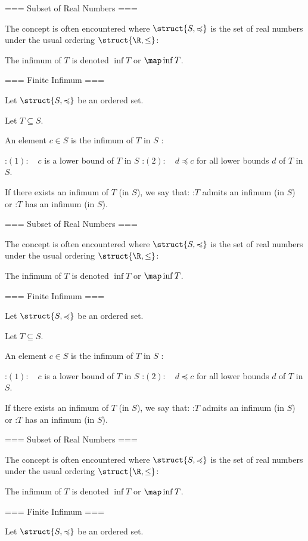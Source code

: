 === Subset of Real Numbers ===

The concept is often encountered where $\struct {S, \preccurlyeq}$ is the set of real numbers under the usual ordering $\struct {\R, \le}$:



The infimum of $T$ is denoted $\inf T$ or $\map \inf T$.


=== Finite Infimum ===

Let $\struct {S, \preccurlyeq}$ be an ordered set.

Let $T \subseteq S$.


An element $c \in S$ is the infimum of $T$ in $S$ :

:$(1): \quad c$ is a lower bound of $T$ in $S$
:$(2): \quad d \preccurlyeq c$ for all lower bounds $d$ of $T$ in $S$.


If there exists an infimum of $T$ (in $S$), we say that:
:$T$ admits an infimum (in $S$) or
:$T$ has an infimum (in $S$).


=== Subset of Real Numbers ===

The concept is often encountered where $\struct {S, \preccurlyeq}$ is the set of real numbers under the usual ordering $\struct {\R, \le}$:



The infimum of $T$ is denoted $\inf T$ or $\map \inf T$.


=== Finite Infimum ===

Let $\struct {S, \preccurlyeq}$ be an ordered set.

Let $T \subseteq S$.


An element $c \in S$ is the infimum of $T$ in $S$ :

:$(1): \quad c$ is a lower bound of $T$ in $S$
:$(2): \quad d \preccurlyeq c$ for all lower bounds $d$ of $T$ in $S$.


If there exists an infimum of $T$ (in $S$), we say that:
:$T$ admits an infimum (in $S$) or
:$T$ has an infimum (in $S$).


=== Subset of Real Numbers ===

The concept is often encountered where $\struct {S, \preccurlyeq}$ is the set of real numbers under the usual ordering $\struct {\R, \le}$:



The infimum of $T$ is denoted $\inf T$ or $\map \inf T$.


=== Finite Infimum ===

Let $\struct {S, \preccurlyeq}$ be an ordered set.

